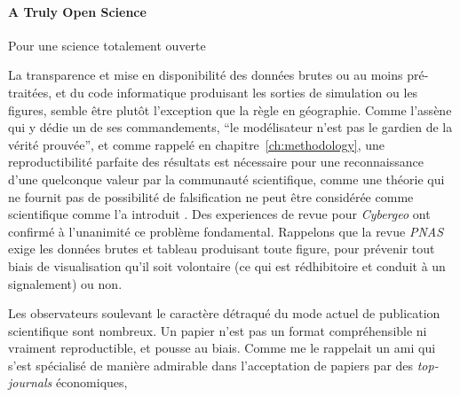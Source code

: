 %



\paragraph{A Truly Open Science}{Pour une science totalement ouverte}



La transparence et mise en disponibilité des données brutes ou au moins pré-traitées, et du code informatique produisant les sorties de simulation ou les figures, semble être plutôt l'exception que la règle en géographie. Comme l'assène  qui y dédie un de ses commandements, ``le modélisateur n'est pas le gardien de la vérité prouvée'', et comme rappelé en chapitre~\ref{ch:methodology}, une reproductibilité parfaite des résultats est nécessaire pour une reconnaissance d'une quelconque valeur par la communauté scientifique, comme une théorie qui ne fournit pas de possibilité de falsification ne peut être considérée comme scientifique comme l'a introduit . Des experiences de revue pour \emph{Cybergeo} ont confirmé à l'unanimité ce problème fondamental. Rappelons que la revue \emph{PNAS} exige les données brutes et tableau produisant toute figure, pour prévenir tout biais de visualisation qu'il soit volontaire (ce qui est rédhibitoire et conduit à un signalement) ou non.



Les observateurs soulevant le caractère détraqué du mode actuel de publication scientifique sont nombreux. Un papier n'est pas un format compréhensible ni vraiment reproductible, et pousse au biais. Comme me le rappelait un ami qui s'est spécialisé de manière admirable dans l'acceptation de papiers par des \emph{top-journals} économiques, 
















